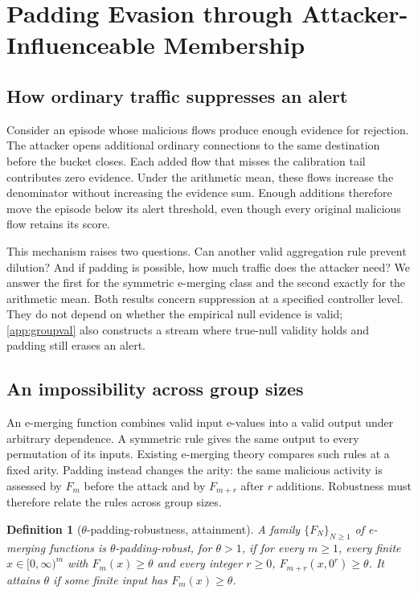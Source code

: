 \documentclass[conference]{IEEEtran}
\newtheorem{definition}{Definition}
\begin{document}
\section{Padding Evasion through Attacker-Influenceable Membership}\label{sec:attack}

\subsection{How ordinary traffic suppresses an alert}

Consider an episode whose malicious flows produce enough evidence for rejection. The attacker opens
additional ordinary connections to the same destination before the bucket closes. Each added flow
that misses the calibration tail contributes zero evidence. Under the arithmetic mean, these flows
increase the denominator without increasing the evidence sum. Enough additions therefore move the
episode below its alert threshold, even though every original malicious flow retains its score.

This mechanism raises two questions. Can another valid aggregation rule prevent dilution? And if
padding is possible, how much traffic does the attacker need? We answer the first for the symmetric
e-merging class and the second exactly for the arithmetic mean. Both results concern suppression at
a specified controller level. They do not depend on whether the empirical null evidence is valid;
\cref{app:groupval} also constructs a stream where true-null validity holds and padding still erases
an alert.

\subsection{An impossibility across group sizes}\label{sec:impossibility}

An e-merging function combines valid input e-values into a valid output under arbitrary dependence.
A symmetric rule gives the same output to every permutation of its inputs. Existing e-merging
theory compares such rules at a fixed arity. Padding instead changes the arity: the same malicious
activity is assessed by $F_m$ before the attack and by $F_{m+r}$ after $r$ additions. Robustness
must therefore relate the rules across group sizes.

\begin{definition}[$\theta$-padding-robustness, attainment]\label{def:padding}
A family $\{F_N\}_{N\ge1}$ of e-merging functions is $\theta$-padding-robust, for $\theta>1$, if for every
$m\ge1$, every finite $x\in[0,\infty)^m$ with $F_m(x)\ge\theta$ and every integer $r\ge0$,
$F_{m+r}(x,0^{r})\ge\theta$. It
\emph{attains} $\theta$ if some finite input has $F_m(x)\ge\theta$.
\end{definition}
\end{document}
